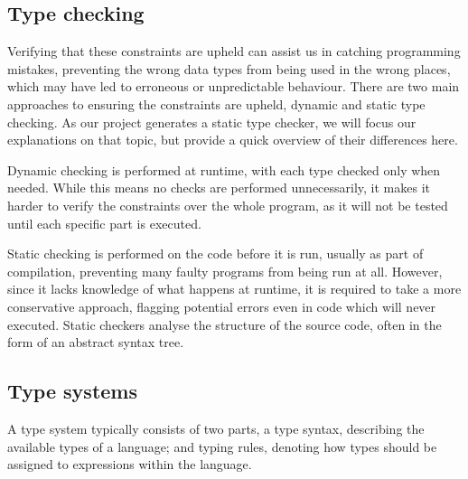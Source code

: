\documentclass[nofilelist]{cslthse-msc}
\newcommand{\CR}[1]{\textcolor{green!60!black}{[\textbf{CR}:#1]}}
\begin{document}
\subsection{Type checking}
Verifying that these constraints are upheld can assist us in catching programming mistakes, preventing the wrong data types from being used in the wrong places, which may have led to erroneous or unpredictable behaviour.
There are two main approaches to ensuring the constraints are upheld, dynamic and static type checking.
As our project generates a static type checker, we will focus our explanations on that topic, but provide a quick overview of their differences here.

Dynamic checking is performed at runtime, with each type checked only when needed.
While this means no checks are performed unnecessarily, it makes it harder to verify the constraints over the whole program, as it will not be tested until each specific part is executed.

Static checking is performed on the code before it is run, usually as part of compilation, preventing many faulty programs from being run at all.
However, since it lacks knowledge of what happens at runtime, it is required to take a more conservative approach, flagging potential errors even in code which will never executed.
Static checkers analyse the structure of the source code, often in the form of an abstract syntax tree.


\subsection{Type systems}
A type system typically consists of two parts, a type syntax, describing the available types of a language; and typing rules, denoting how types should be assigned to expressions within the language.
\end{document}
